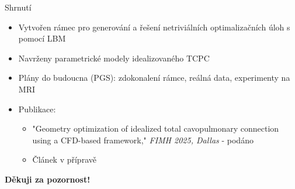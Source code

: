 \documentclass[aspectratio=169,xcolor=dvipsnames]{beamer}
\begin{document}
\begin{frame}{Shrnutí}

	\begin{itemize}
		\setlength\itemsep{1.1em}
		\item Vytvořen rámec pro generování a řešení netriviálních optimalizačních úloh s pomocí LBM
		\item Navrženy parametrické modely idealizovaného TCPC
		\item Plány do budoucna (PGS):  zdokonalení rámce, reálná data, experimenty na MRI
		\item Publikace:\\[5pt]
		\begin{itemize}
			\item "Geometry optimization of idealized total	cavopulmonary connection using a CFD-based framework," \textit{FIMH 2025, Dallas} - podáno\\[5pt]
			\item Článek v přípravě
		\end{itemize}
	\end{itemize}
	\vfill%
	\huge{\centerline{\textbf{Děkuji za pozornost!}}}
\end{frame}
%
%
\end{document}
